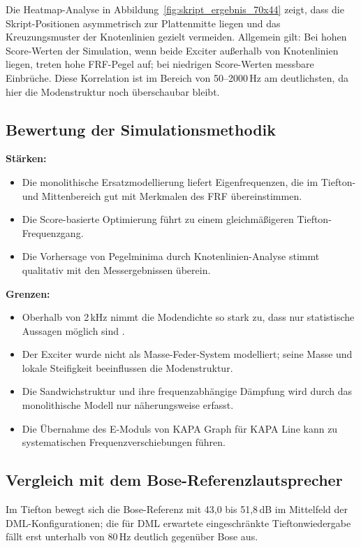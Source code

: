 Die Heatmap-Analyse in Abbildung~\ref{fig:skript_ergebnis_70x44} zeigt, dass die Skript-Positionen asymmetrisch zur Plattenmitte liegen und das Kreuzungsmuster der Knotenlinien gezielt vermeiden. Allgemein gilt: Bei hohen Score-Werten der Simulation, wenn beide Exciter außerhalb von Knotenlinien liegen, treten hohe FRF-Pegel auf; bei niedrigen Score-Werten messbare Einbrüche. Diese Korrelation ist im Bereich von 50--2000\,Hz am deutlichsten, da hier die Modenstruktur noch überschaubar bleibt.

\subsection{Bewertung der Simulationsmethodik}

\textbf{Stärken:}
\begin{itemize}
    \item Die monolithische Ersatzmodellierung liefert Eigenfrequenzen, die im Tiefton- und Mittenbereich gut mit Merkmalen des FRF übereinstimmen.
    \item Die Score-basierte Optimierung führt zu einem gleichmäßigeren Tiefton-Frequenzgang.
    \item Die Vorhersage von Pegelminima durch Knotenlinien-Analyse stimmt qualitativ mit den Messergebnissen überein.
\end{itemize}

\textbf{Grenzen:}
\begin{itemize}
    \item Oberhalb von 2\,kHz nimmt die Modendichte so stark zu, dass nur statistische Aussagen möglich sind \cite{Cremer1996}.
    \item Der Exciter wurde nicht als Masse-Feder-System modelliert; seine Masse und lokale Steifigkeit beeinflussen die Modenstruktur.
    \item Die Sandwichstruktur und ihre frequenzabhängige Dämpfung wird durch das monolithische Modell nur näherungsweise erfasst.
    \item Die Übernahme des E-Moduls von KAPA Graph für KAPA Line kann zu systematischen Frequenzverschiebungen führen.
\end{itemize}

\subsection{Vergleich mit dem Bose-Referenzlautsprecher}

Im Tiefton bewegt sich die Bose-Referenz mit 43,0 bis 51,8\,dB im Mittelfeld der DML-Konfigurationen; die für DML erwartete eingeschränkte Tieftonwiedergabe \cite{Harris2000} fällt erst unterhalb von 80\,Hz deutlich gegenüber Bose aus.

